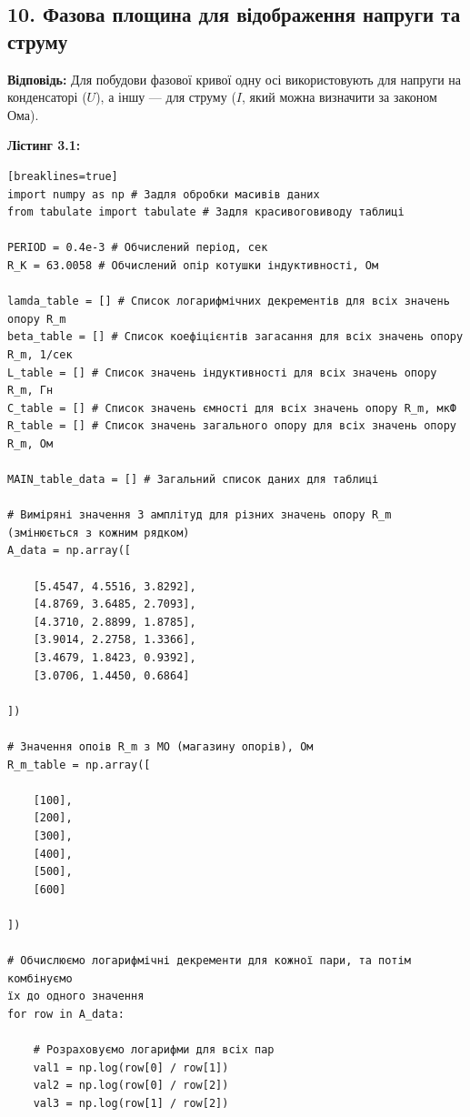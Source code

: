 \documentclass[12pt,a4paper]{article}
\begin{document}
    \subsection*{10. Фазова площина для відображення напруги та струму}
    \textbf{Відповідь:}  
    Для побудови фазової кривої одну осі використовують для напруги на конденсаторі ($U$), а іншу --- для струму ($I$, який можна визначити за законом Ома). 


    \newpage

    \hypertarget{listing1}{}

    \textbf{\large Лістинг 3.1:}

    \vspace{1em}

    \small{

    \begin{verbatim}[breaklines=true]
import numpy as np # Задля обробки масивів даних
from tabulate import tabulate # Задля красивоговиводу таблиці

PERIOD = 0.4e-3 # Обчислений період, сек
R_K = 63.0058 # Обчислений опір котушки індуктивності, Ом

lamda_table = [] # Список логарифмічних декрементів для всіх значень опору R_m
beta_table = [] # Список коефіцієнтів загасання для всіх значень опору R_m, 1/сек
L_table = [] # Список значень індуктивності для всіх значень опору R_m, Гн
C_table = [] # Список значень ємності для всіх значень опору R_m, мкФ
R_table = [] # Список значень загального опору для всіх значень опору R_m, Ом

MAIN_table_data = [] # Загальний список даних для таблиці

# Виміряні значення 3 амплітуд для різних значень опору R_m (змінюється з кожним рядком)
A_data = np.array([

    [5.4547, 4.5516, 3.8292],
    [4.8769, 3.6485, 2.7093],
    [4.3710, 2.8899, 1.8785],
    [3.9014, 2.2758, 1.3366],
    [3.4679, 1.8423, 0.9392],
    [3.0706, 1.4450, 0.6864]

])

# Значення опоів R_m з МО (магазину опорів), Ом
R_m_table = np.array([

    [100],
    [200],
    [300],
    [400],
    [500],
    [600]

])

# Обчислюємо логарифмічні декременти для кожної пари, та потім комбінуємо
їх до одного значення
for row in A_data:

    # Розраховуємо логарифми для всіх пар
    val1 = np.log(row[0] / row[1])
    val2 = np.log(row[0] / row[2])
    val3 = np.log(row[1] / row[2])


\end{verbatim}}
\end{document}
